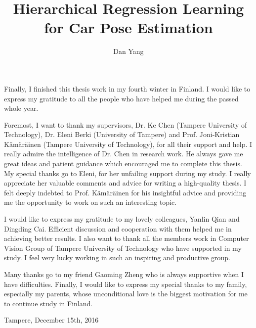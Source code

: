 \documentclass{tutmscthesis}[2010/09/22]
\title{Hierarchical Regression Learning for Car Pose Estimation}
\author{Dan Yang}
\numberwithin{equation}{section}
\numberwithin{table}{section}
\numberwithin{figure}{section}
\begin{document}

\setcounter{page}{0}

\maketitle
\newpage




\begin{preface}

Finally, I finished this thesis work in my fourth winter in Finland.  
I would like to express my gratitude to all the people who have helped me during the passed whole year.

Foremost, I want to thank my supervisors, Dr. Ke Chen (Tampere University of Technology), Dr. Eleni Berki (University of Tampere) and Prof. Joni-Kristian K\"am\"ar\"ainen (Tampere University of Technology), for all their support and help. I really admire the intelligence of Dr. Chen in research work. 
He always gave me great ideas and patient guidance which encouraged me to complete this thesis. 
My special thanks go to Eleni, for her unfailing support during my study. 
I really appreciate her valuable comments and advice for writing a high-quality thesis.
I felt deeply indebted to Prof.  K\"am\"ar\"ainen for his insightful advice and providing me the opportunity to work on such an interesting topic.

I would like to express my gratitude to my lovely colleagues, Yanlin Qian and Dingding Cai. 
Efficient discussion and cooperation with them helped me in achieving better results.
I also want to thank all the members work in Computer Vision Group of Tampere University of Technology who have supported in my study. 
I feel very lucky working in such an inspiring and productive group.

Many thanks go to my friend Gaoming Zheng who is always supportive when I have difficulties.
Finally, I would like to express my special thanks to my family, especially my parents,
whose unconditional love is the biggest motivation for me to continue study in Finland.
  
 
Tampere, December 15th, 2016
\end{preface}


\renewcommand\refname{REFERENCES}
\renewcommand\contentsname{CONTENTS}

\pagestyle{masters}
\newpage
\end{document}
